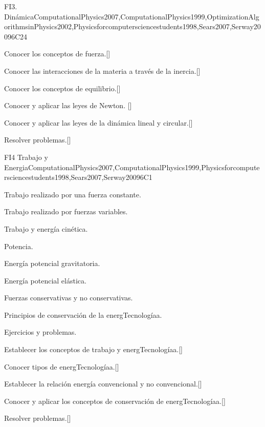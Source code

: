 \begin{syllabus}
\begin{unit}{}{FI3. Dinámica}{ComputationalPhysics2007,ComputationalPhysics1999,OptimizationAlgorithmsinPhysics2002,Physicsforcomputersciencestudents1998,Sears2007,Serway2009}{6}{C24}
   \begin{learningoutcomes}
      \item Conocer los conceptos de fuerza.[\Usage]
      \item Conocer las interacciones de la materia a través de la inercia.[\Usage]
      \item Conocer los conceptos de equilibrio.[\Usage]
      \item Conocer y aplicar las leyes de Newton. [\Usage]   
      \item Conocer y aplicar las leyes de la dinámica lineal y circular.[\Usage]
      \item Resolver problemas.[\Usage]
   \end{learningoutcomes}
\end{unit}

\begin{unit}{}{FI4 Trabajo y Energia}{ComputationalPhysics2007,ComputationalPhysics1999,Physicsforcomputersciencestudents1998,Sears2007,Serway2009}{6}{C1}
\begin{topics}
      \item Trabajo realizado por una fuerza constante.
      \item Trabajo realizado por fuerzas variables.
      \item Trabajo y energía cinética.
      \item Potencia.
      \item Energía potencial gravitatoria.
      \item Energía potencial elástica.
      \item Fuerzas conservativas y no conservativas.
      \item Principios de conservación de la energTecnologíaa.
      \item Ejercicios y problemas.
   \end{topics}

   \begin{learningoutcomes}
      \item Establecer los conceptos de trabajo y energTecnologíaa.[\Usage]
      \item Conocer tipos de energTecnologíaa.[\Usage]
      \item Establecer la relación energía convencional y no convencional.[\Usage]
      \item Conocer y aplicar los conceptos de conservación de energTecnologíaa.[\Usage]
      \item Resolver problemas.[\Usage]
   \end{learningoutcomes}
\end{unit}


\end{syllabus}
